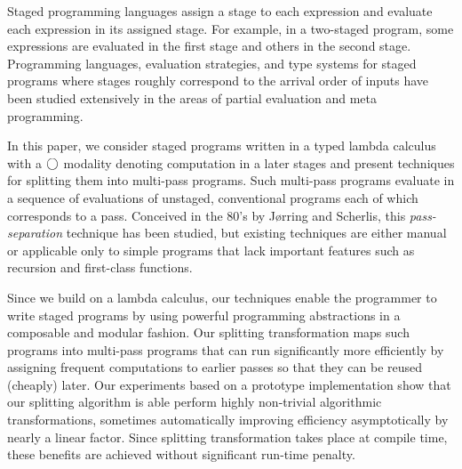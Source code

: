 Staged programming languages assign a stage to each expression and
evaluate each expression in its assigned stage.  For example, in a
two-staged program, some expressions are evaluated in the first stage
and others in the second stage.  Programming languages, evaluation
strategies, and type systems for staged programs where stages roughly
correspond to the arrival order of inputs have been studied
extensively in the areas of partial evaluation and meta programming.

In this paper, we consider staged programs written in a typed lambda
calculus with a $\bigcirc$ modality denoting computation in a later
stages and present techniques for splitting them into multi-pass
programs. Such multi-pass programs evaluate in a sequence of
evaluations of unstaged, conventional programs each of which
corresponds to a pass.  Conceived in the 80's by J{\o}rring and
Scherlis, this {\em pass-separation} technique has been studied, but
existing techniques are either manual or applicable only to simple programs
that lack important features such as recursion and first-class
functions.



Since we build on a lambda calculus, our techniques enable the
programmer to write staged programs by using powerful programming
abstractions in a composable and modular fashion. Our splitting
transformation maps such programs into multi-pass programs that can
run significantly more efficiently by assigning frequent computations
to earlier passes so that they can be reused (cheaply) later.  Our
experiments based on a prototype implementation show that our
splitting algorithm is able perform highly non-trivial algorithmic
transformations, sometimes automatically improving efficiency
asymptotically by nearly a linear factor.  Since splitting
transformation takes place at compile time, these benefits are
achieved without significant run-time penalty.





